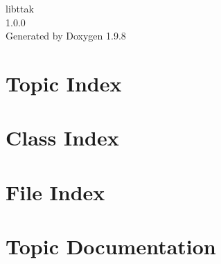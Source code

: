 \documentclass[twoside]{book}
\newcommand{\+}{\discretionary{\mbox{\scriptsize$\hookleftarrow$}}{}{}}
\newcommand{\clearemptydoublepage}{%
    \newpage{\pagestyle{empty}\cleardoublepage}%
  }
\begin{document}
  \raggedbottom
    \hypersetup{pageanchor=false,
                bookmarksnumbered=true,
                pdfencoding=unicode
               }
  \begin{titlepage}
  \vspace*{7cm}
  \begin{center}%
  {\Large libttak}\\
  [1ex]\large 1.\+0.\+0 \\
  \vspace*{1cm}
  {\large Generated by Doxygen 1.9.8}\\
  \end{center}
  \end{titlepage}
  \clearemptydoublepage
  \tableofcontents
  \clearemptydoublepage
  \hypersetup{pageanchor=true}








\chapter{Topic Index}

\chapter{Class Index}

\chapter{File Index}

\chapter{Topic Documentation}



\end{document}
